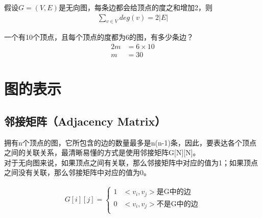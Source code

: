 \begin{tcolorbox}
	假设$ G = (V, E) $是无向图，每条边都会给顶点的度之和增加2，则
	\begin{align}
		\sum_{v \in V} deg(v) = 2|E|
	\end{align}
\end{tcolorbox}

\begin{tcolorbox}
	一个有10个顶点，且每个顶点的度都为6的图，有多少条边？
	\begin{align*}
		2m & = 6 \times 10 \\
		m  & = 30
	\end{align*}
\end{tcolorbox}

\newpage

\section{图的表示}

\subsection{邻接矩阵（Adjacency Matrix）}

拥有n个顶点的图，它所包含的边的数量最多是n(n-1)条，因此，要表达各个顶点之间的关联关系，最清晰易懂的方式是使用邻接矩阵G[N][N]。\\

对于无向图来说，如果顶点之间有关联，那么邻接矩阵中对应的值为1；如果顶点之间没有关联，那么邻接矩阵中对应的值为0。

\vspace{-0.5cm}

\begin{align}\nonumber
	G[i][j] = \begin{cases}
		1 & <v_i, v_j>\text{是G中的边}   \\
		0 & <v_i, v_j>\text{不是G中的边} \\
	\end{cases}
\end{align}

\begin{figure}[H]
	\centering
\end{figure}

